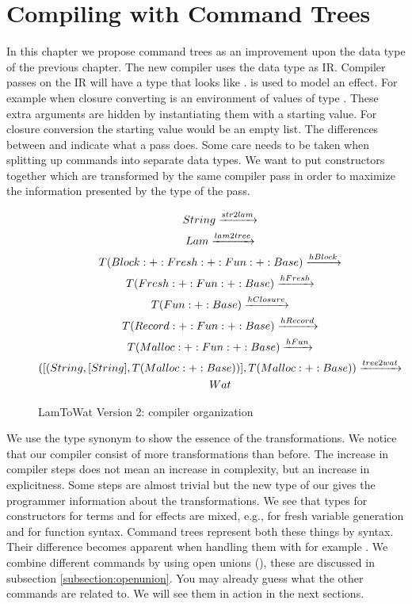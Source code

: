 
\chapter{\label{chap:treecomp}Compiling with Command Trees}

In this chapter we propose command trees as an improvement upon the  data type of the previous chapter. The new compiler uses the  data type as IR. Compiler passes on the IR will have a type that looks like .  is used to model an effect. For example when closure converting  is an environment of values of type . These extra arguments are hidden by instantiating them with a starting value. For closure conversion the starting value would be an empty list. The differences between  and  indicate what a pass does. Some care needs to be taken when splitting up commands into separate data types. We want to put constructors together which are transformed by the same compiler pass in order to maximize the information presented by the type of the pass.

\begin{figure}
\begin{gather*}
  String \xrightarrow{str2lam}\\
  Lam \xrightarrow{lam2tree}\\
  T (Block :+: Fresh :+: Fun :+: Base) \xrightarrow{hBlock}\\
  T           (Fresh :+: Fun :+: Base) \xrightarrow{hFresh}\\
  T                     (Fun :+: Base) \xrightarrow{hClosure}\\
  T          (Record :+: Fun :+: Base) \xrightarrow{hRecord}\\
  T          (Malloc :+: Fun :+: Base) \xrightarrow{hFun}\\
  ([(String,[String],T (Malloc :+: Base))], T (Malloc :+: Base)) \xrightarrow{tree2wat}\\
  Wat
\end{gather*}
\caption{LamToWat Version 2: compiler organization}
\label{fig:lam2watv2org}
\end{figure}

We use the type synonym  to show the essence of the transformations. We notice that our compiler consist of more transformations than before. The increase in compiler steps does not mean an increase in complexity, but an increase in explicitness. Some steps are almost trivial but the new type of our  gives the programmer information about the transformations. We see that types for constructors for terms and for effects are mixed, e.g.,  for fresh variable generation and  for function syntax. Command trees represent both these things by syntax. Their difference becomes apparent when handling them with for example . We combine different commands by using open unions (\icode{:+:}), these are discussed in subsection \ref{subsection:openunion}. You may already guess what the other commands are related to. We will see them in action in the next sections.

